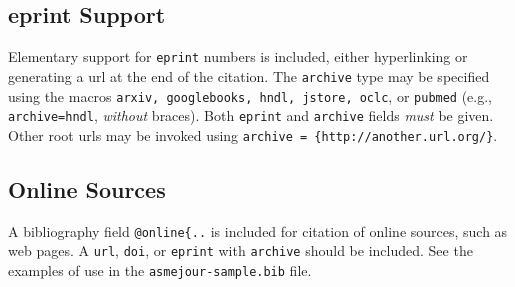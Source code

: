 \documentclass[subscriptcorrection,upint,varvw,barcolor=Goldenrod3,mathalfa=cal=euler,balance,hyphenate,french,pdf-a]{asmejour} %
\begin{document}



\begin{table}[t]
\caption{Table with more complicated columns}\label{tab:2}%
%
\end{table}


\subsection{eprint Support} Elementary support for \texttt{eprint} numbers is included, either hyperlinking or generating a url at the end of the citation. The \texttt{archive} type may be specified using the macros \texttt{arxiv, googlebooks, hndl, jstore, oclc}, or \texttt{pubmed} (e.g., \texttt{archive=hndl},  \textit{without} braces). Both \texttt{eprint} and \texttt{archive} fields \textit{must} be given. Other root urls may be invoked using \verb|archive = {http://another.url.org/}|.

\subsection{Online Sources} A bibliography field \verb|@online{..| is included for citation of online sources, such as web pages. A \texttt{url}, \texttt{doi}, or \texttt{eprint} with \texttt{archive} should be included. See the examples of use in the \texttt{asmejour-sample.bib} file. 
\end{document}
